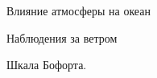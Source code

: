 \begin{chapter}{Влияние атмосферы на океан}
\begin{section}{Наблюдения за ветром}
\begin{paragraph}{Шкала Бофорта.}


\end{paragraph}
\end{section}
\end{chapter}

